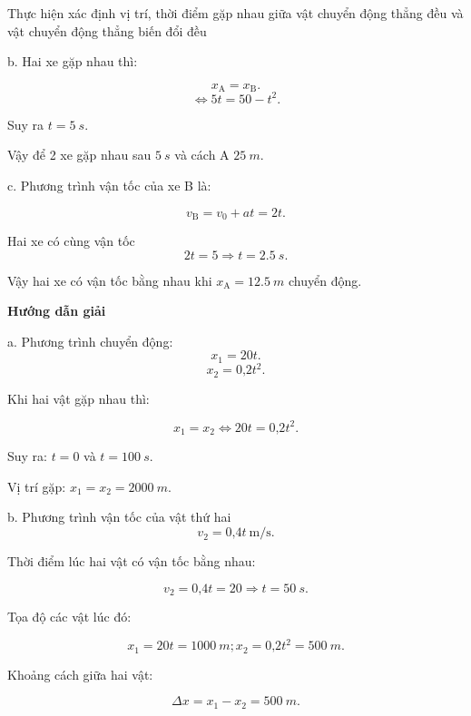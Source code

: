 \begin{dang}{Thực hiện xác định vị trí, thời điểm gặp nhau giữa vật chuyển động thẳng đều và vật chuyển động thẳng biến đổi đều}
{		b. Hai xe gặp nhau thì:
		
		$$x_\text{A} = x_\text{B}.$$
		$$\Leftrightarrow 5t = 50 - t^2.$$
		
		Suy ra $t =\SI{5}{s}.$
		
		Vậy để 2 xe gặp nhau sau $\SI{5}{s}$ và cách A $\SI{25}{m}.$
		
		c. Phương trình vận tốc của xe B là:
		
		$$v_\text{B} = v_0 +at = 2t.$$
		
		Hai xe có cùng vận tốc
		$$2t = 5 \Rightarrow t =\SI{2,5}{s}.$$
		
		Vậy hai xe có vận tốc bằng nhau khi $x_\text{A} = \SI{12,5}{m}$ chuyển động. 
		
	}
	{	\begin{center}
			\textbf{Hướng dẫn giải}
		\end{center}
		
		a. Phương trình chuyển động:
		$$x_1 = 20t.$$
		$$x_2 = \text{0,2}t^2.$$
		
		Khi hai vật gặp nhau thì:
		
		$$x_1 =x_2 \Leftrightarrow 20t = \text{0,2}t^2.$$
		
		Suy ra: $t =0$ và $t =\SI{100}{s}.$
		
		Vị trí gặp: $x_1 =x_2 =\SI{2000}{m}.$
		
		b. Phương trình vận tốc của vật thứ hai
		$$v_2 =\text{0,4}t\ \text{m/s}.$$
		
		Thời điểm lúc hai vật có vận tốc bằng nhau: 
		
		$$v_2 =\text{0,4}t = 20 \Rightarrow t = \SI{50}{s}.$$
		
		Tọa độ các vật lúc đó: 
		
		$$x_1 = 20t = \SI{1000}{m}; x_2 = \text{0,2}t^2 = \SI{500}{m}.$$
		
		Khoảng cách giữa hai vật: 
		
		$$\Delta x = x_1 - x_2 =\SI{500}{m}.$$
	}
	
\end{dang}
